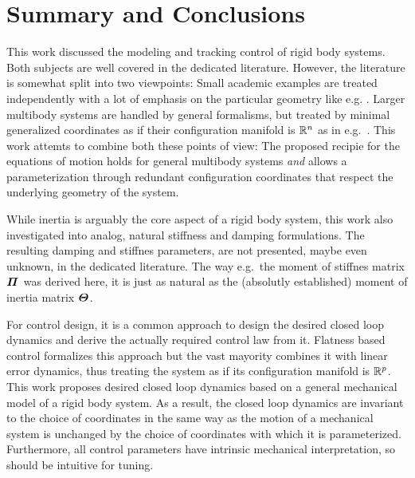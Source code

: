 \chapter{Summary and Conclusions}

This work discussed the modeling and tracking control of rigid body systems.
Both subjects are well covered in the dedicated literature.
However, the literature is somewhat split into two viewpoints:
Small academic examples are treated independently with a lot of emphasis on the particular geometry like e.g. \cite{Marsden:MechanicsAndSymmetry}.
Larger multibody systems are handled by general formalisms, but treated by minimal generalized coordinates as if their configuration manifold is $\mathbb{R}^n$ as in e.g.\ \cite{Schwertassek:MultibodySystems}.
This work attemts to combine both these points of view:
The proposed recipie for the equations of motion holds for general multibody systems \textit{and} allows a parameterization through redundant configuration coordinates that respect the underlying geometry of the system.

While inertia is arguably the core aspect of a rigid body system, this work also investigated into analog, natural stiffness and damping formulations.
The resulting damping and stiffnes parameters, are not presented, maybe even unknown, in the dedicated literature.
The way e.g.\ the moment of stiffnes matrix $\bodyMOS{}{}$ was derived here, it is just as natural as the (absolutly established) moment of inertia matrix $\bodyMOI{}{}$.

For control design, it is a common approach to design the desired closed loop dynamics and derive the actually required control law from it.
Flatness based control formalizes this approach but the vast mayority combines it with linear error dynamics, thus treating the system as if its configuration manifold is $\mathbb{R}^p$.
This work proposes desired closed loop dynamics based on a general mechanical model of a rigid body system.
As a result, the closed loop dynamics are invariant to the choice of coordinates in the same way as the motion of a mechanical system is unchanged by the choice of coordinates with which it is parameterized.
Furthermore, all control parameters have intrinsic mechanical interpretation, so should be intuitive for tuning.

